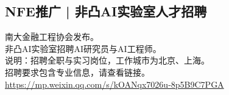 \documentclass[letterpaper, 12pt]{article}
\begin{document}
\begin{multicols}{2}
\subsection{NFE推广 | 非凸AI实验室人才招聘}
南大金融工程协会发布。
\\非凸AI实验室招聘AI研究员与AI工程师。
\\说明：招聘全职与实习岗位，工作城市为北京、上海。
\\招聘要求包含专业信息，请查看链接。
\url{https://mp.weixin.qq.com/s/kOANqx7026u-8p5B9C7PGA}
\end{multicols}
\end{document}
